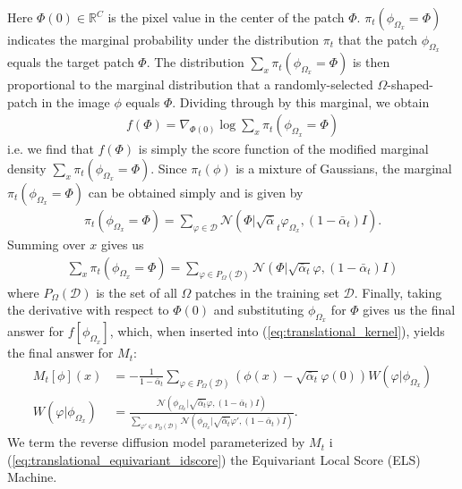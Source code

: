 \documentclass{article}
\theoremstyle{plain}
\theoremstyle{definition}
\theoremstyle{remark}
\begin{document}
Here $\Phi(0) \in \mathbb{R}^C$ is the pixel value in the center of the patch $\Phi$. $\pi_t(\phi_{\Omega_x} = \Phi)$ indicates the marginal probability under the distribution $\pi_t$ that the patch $\phi_{\Omega_x}$ equals the target patch $\Phi$. The distribution $\sum_{x} \pi_t(\phi_{\Omega_x} = \Phi)$ is then proportional to the marginal distribution that a randomly-selected $\Omega$-shaped-patch in the image $\phi$ equals $\Phi$. Dividing through by this marginal, we obtain
\begin{align}\label{eq:equivariant_marginal_score}
    f(\Phi) = \nabla_{\Phi(0)} \log \sum_x \pi_t(\phi_{\Omega_x} = \Phi)
\end{align}
i.e. we find that $f(\Phi)$ is simply the score function of the modified marginal density $\sum_x \pi_t(\phi_{\Omega_x} = \Phi)$. Since $\pi_t(\phi)$ is a mixture of Gaussians, the marginal $\pi_t(\phi_{\Omega_x} = \Phi)$ can be obtained simply and is given by
\begin{align}
    \pi_t(\phi_{\Omega_x} =\Phi) = \sum_{\varphi \in \mathcal{D}} \mathcal{N}(\Phi|\sqrt{\bar{\alpha}}_t \varphi_{\Omega_x}, (1 - \bar{\alpha}_t) I).
\end{align}
Summing over $x$ gives us
\begin{align}
    \sum_x \pi_t(\phi_{\Omega_x} = \Phi) = \sum_{\varphi \in P_{\Omega}(\mathcal{D})} \mathcal{N}(\Phi | \sqrt{\bar{\alpha}_t} \varphi, (1 - \bar{\alpha}_t) I)
\end{align}
where $P_{\Omega}(\mathcal{D})$ is the set of all $\Omega$ patches in the training set $\mathcal{D}$. Finally, taking the derivative with respect to $\Phi(0)$ and substituting $\phi_{\Omega_x}$ for $\Phi$ gives us the final answer for $f[\phi_{\Omega_{x}}]$, which, when inserted into (\ref{eq:translational_kernel}), yields the final answer for $M_t$:
\begin{align}\label{eq:translational_equivariant_idscore}
    M_t[\phi](x) &= -\frac{1}{1 - \bar{\alpha}_t} \sum_{\varphi \in P_{\Omega}(\mathcal{D})} (\phi(x) - \sqrt{\bar{\alpha}_t}\varphi(0)) W(\varphi|\phi_{\Omega_x}) \\
    W(\varphi|\phi_{\Omega_x}) &= \frac{\mathcal{N}(\phi_{\Omega_x}|\sqrt{\bar{\alpha}_t} \varphi, (1 - \bar{\alpha}_t) I)}{\sum_{\varphi' \in P_{\Omega}(\mathcal{D})} \mathcal{N}(\phi_{\Omega_x} |\sqrt{\bar{\alpha}_t} \varphi', (1 - \bar{\alpha}_t) I)}.
\end{align}
We term the reverse diffusion model parameterized by $M_t$ i (\ref{eq:translational_equivariant_idscore}) the Equivariant Local Score (ELS) Machine.
\end{document}
